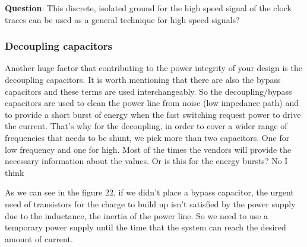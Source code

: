 \documentclass[final]{cubedoc}
\begin{document}
	\textbf{Question}: This discrete, isolated ground for the high speed signal of the clock traces can be used as a general technique for high speed signals?
	
	\subsubsection{Decoupling capacitors}
	
	Another huge factor that contributing to the power integrity of your design is the decoupling capacitors. It is worth mentioning that there are also the bypass capacitors and these terms are used interchangeably. So the decoupling/bypass capacitors are used to clean the power line from noise (low impedance path) and to provide a short burst of energy when the fast switching request power to drive the current. That's why for the decoupling, in order to cover a wider range of frequencies that needs to be shunt, we pick more than two capacitors. One for low frequency and one for high. Most of the times the vendors will provide the necessary information about the values. Or is this for the energy bursts? No I think
	
	
	As we can see in the figure 22, if we didn't place a bypass capacitor, the urgent need of transistors for the charge to build up isn't satisfied by the power supply due to the inductance, the inertia of the power line. So we need to use a temporary power supply until the time that the system can reach the desired amount of current. 
	
\end{document}
